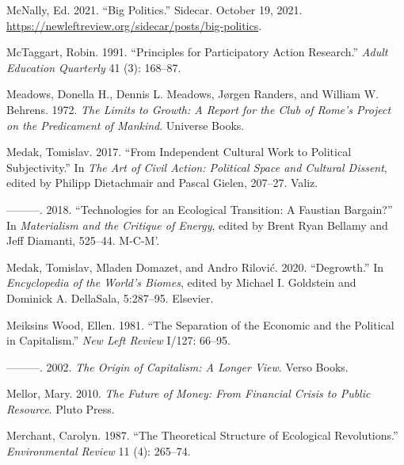 \documentclass[a4paper, nobind]{templates/ociamthesis}
\newlength{\cslhangindent}
\newenvironment{CSLReferences}[2] %
 {%
  \setlength{\parindent}{0pt}
  \ifodd #1
  \let\oldpar\par
  \def\par{\hangindent=\cslhangindent\oldpar}
  \fi
  \setlength{\parskip}{1mm}
  \setlength{\baselineskip}{6mm}
 }%
 {}
\begin{document}
\begin{CSLReferences}{1}{0}
\leavevmode{}%
McNally, Ed. 2021. {``Big {Politics}.''} {Sidecar}. October 19, 2021. \url{https://newleftreview.org/sidecar/posts/big-politics}.

\leavevmode{}%
McTaggart, Robin. 1991. {``Principles for {Participatory Action Research}.''} \emph{Adult Education Quarterly} 41 (3): 168--87.

\leavevmode{}%
Meadows, Donella H., Dennis L. Meadows, Jørgen Randers, and William W. Behrens. 1972. \emph{The {Limits} to {Growth}: {A Report} for the {Club} of {Rome}'s {Project} on the {Predicament} of {Mankind}}. {Universe Books}.

\leavevmode{}%
Medak, Tomislav. 2017. {``From {Independent Cultural Work} to {Political Subjectivity}.''} In \emph{The {Art} of {Civil Action}: {Political Space} and {Cultural Dissent}}, edited by Philipp Dietachmair and Pascal Gielen, 207--27. {Valiz}.

\leavevmode{}%
---------. 2018. {``Technologies for an {Ecological Transition}: {A Faustian Bargain}?''} In \emph{Materialism and the {Critique} of {Energy}}, edited by Brent Ryan Bellamy and Jeff Diamanti, 525--44. {M-C-M'}.

\leavevmode{}%
Medak, Tomislav, Mladen Domazet, and Andro Rilović. 2020. {``Degrowth.''} In \emph{Encyclopedia of the {World}'s {Biomes}}, edited by Michael I. Goldstein and Dominick A. DellaSala, 5:287--95. {Elsevier}.

\leavevmode{}%
Meiksins Wood, Ellen. 1981. {``The Separation of the {Economic} and the {Political} in {Capitalism}.''} \emph{New Left Review} I/127: 66--95.

\leavevmode{}%
---------. 2002. \emph{The {Origin} of {Capitalism}: {A Longer View}}. {Verso Books}.

\leavevmode{}%
Mellor, Mary. 2010. \emph{The Future of Money: From Financial Crisis to Public Resource}. {Pluto Press}.

\leavevmode{}%
Merchant, Carolyn. 1987. {``The {Theoretical Structure} of {Ecological Revolutions}.''} \emph{Environmental Review} 11 (4): 265--74.


\end{CSLReferences}
\end{document}
